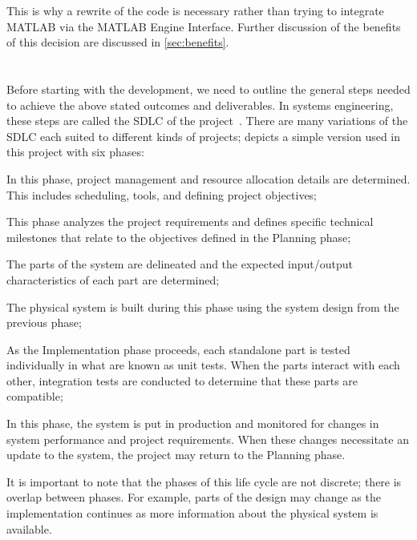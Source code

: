 This is why a rewrite of the code is necessary rather than trying
to integrate MATLAB via the MATLAB Engine Interface. Further
discussion of the benefits of this decision are discussed in \cref{sec:benefits}.

\section[\glsentrylong{SDLC}]{}\label{sec:sdlc}

Before starting with the development, we need to outline the general steps
needed to achieve the above stated outcomes and deliverables. In systems engineering,
these steps are called the \acrfull{SDLC} of the project~\autocite{IRM-SDLC:DoJ:2003}.
There are many variations of the \acrshort{SDLC} each suited to different kinds
of projects;  depicts a simple version used in this project with six phases:

\begin{description}[font=\textpluscolon]
	\item[Planning] In this phase, project management
		and resource allocation details are determined.
		This includes scheduling, tools, and
		defining project objectives;
	\item[Analysis] This phase analyzes the project
		requirements and defines specific
		technical milestones that relate to the
		objectives defined in the Planning phase;
	\item[Design] The parts of the system are
		delineated and the expected input/output
		characteristics of each part are
		determined;
	\item[Implementation] The physical system is built
		during this phase using the system design
		from the previous phase;
	\item[Testing] As the Implementation phase
		proceeds, each standalone part is tested
		individually in what are known as unit
		tests. When the parts interact with each
		other, integration tests are conducted to
		determine that these parts are compatible;
	\item[Maintenance] In this phase, the system is put in
		production and monitored for changes in system
		performance and project requirements. When these
		changes necessitate an update to the system, the
		project may return to the Planning phase.
\end{description}

It is important to note that the phases of this life cycle
are not discrete; there is overlap between phases. For
example, parts of the design may change as the
implementation continues as more information about the
physical system is available.

